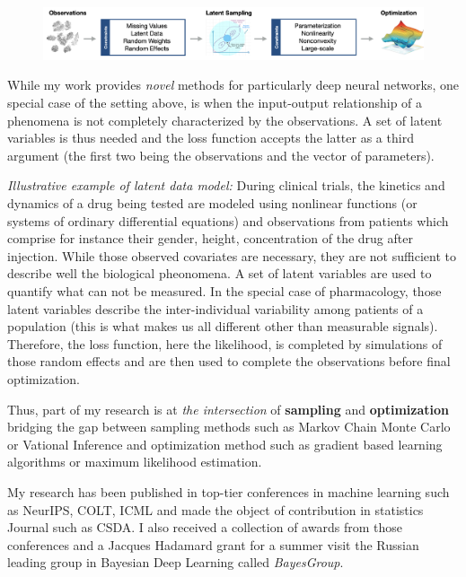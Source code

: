\documentclass[twoside,11pt]{article}
\begin{document}
\begin{figure}[h]
\centering
\includegraphics[width=\textwidth]{fig}
\end{figure}

While my work provides \emph{novel} methods for particularly deep neural networks, one special case of the setting above, is when the input-output relationship of a phenomena is not completely characterized by the observations.
A set of latent variables is thus needed and the loss function accepts the latter as a third argument (the first two being the observations and the vector of parameters).

\noindent \textit{ Illustrative example of latent data model:} 
During clinical trials, the kinetics and dynamics of a drug being tested are modeled using nonlinear functions (or systems of ordinary differential equations) and observations from patients which comprise for instance their gender, height, concentration of the drug after injection.
While those observed covariates are necessary, they are not sufficient to describe well the biological pheonomena. 
A set of latent variables are used to quantify what can not be measured. 
In the special case of pharmacology, those latent variables describe the inter-individual variability among patients of a population (this is what makes us all different other than measurable signals). 
Therefore, the loss function, here the likelihood, is completed by simulations of those random effects and are then used to complete the observations before final optimization.

Thus, part of my research is at \emph{the intersection} of \textbf{sampling} and \textbf{optimization} bridging the gap between sampling methods such as Markov Chain Monte Carlo or Vational Inference and optimization method such as gradient based learning algorithms or maximum likelihood estimation.

My research has been published in top-tier conferences in machine learning such as NeurIPS, COLT, ICML and made the object of contribution in statistics Journal such as CSDA. I also received a collection of awards from those conferences and a Jacques Hadamard grant for a summer visit the Russian leading group in Bayesian Deep Learning called \emph{BayesGroup}.
\end{document}
